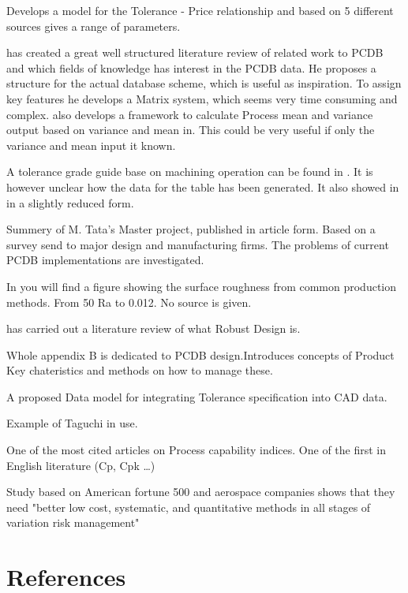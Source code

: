 \documentclass[aip,amsmath,reprint, author-year]{revtex4-1}
\begin{document}
\citet{sfantsikopoulos1990cost} Develops a model for the Tolerance - Price relationship and based on 5 different sources gives a range of parameters. 

\citet{kern2003forecasting} has created a great well structured literature review of related work to PCDB and which fields of knowledge has interest in the PCDB data. He proposes a structure for the actual database scheme, which is useful as inspiration. To assign key features he develops a Matrix system, which seems very time consuming and complex. \citet{kern2003forecasting} also develops a framework to calculate Process mean and variance output based on variance and mean in. This could be very useful if only the variance and mean input it known.

A tolerance grade guide base on machining operation can be found in \citet{american1978preferred}. It is however unclear how the data for the table has been generated. It also showed in \citet{united1967preferred} in a slightly reduced form.

\citet{tata1999process} Summery of M. Tata's Master project, published in article form. Based on a survey send to major design and manufacturing firms. The problems of current PCDB implementations are investigated. 

In \citet[p. 715]{oberg2008machinery} you will find a figure showing the surface roughness from common production methods. From 50 Ra to 0.012. No source is given.

\citet{arvidsson2008principles} has carried out a literature review of what Robust Design is.


\citet{thornton2004variation} Whole appendix B is dedicated to PCDB design.Introduces concepts of Product Key chateristics and methods on how to manage these.

\citet{feng1995dimension} A proposed Data model for integrating Tolerance specification into CAD data. 

\citet{yang1998design} Example of Taguchi in use. 

\citet{kane1986process} One of the most cited articles on Process capability indices. One of the first in English literature (Cp, Cpk …)

\citet{thornton2000more}Study based on American fortune 500 and aerospace companies shows that they need "better low cost, systematic, and quantitative methods in all stages of variation risk management"

\section*{References}

\end{document}
